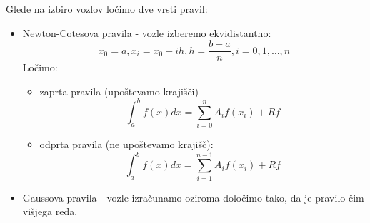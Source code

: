 \documentclass[a4paper,12pt]{article}
\theoremstyle{definition}
\theoremstyle{remark}
\begin{document}
Glede na izbiro vozlov ločimo dve vrsti pravil:
\begin{itemize}
    \item Newton-Cotesova pravila - vozle izberemo ekvidistantno: 
    \begin{equation*}
        x_0 = a, x_i = x_0 + ih, h = \frac{b-a}{n}, i = 0, 1, \dots, n
    \end{equation*}
    Ločimo:
    \begin{itemize}
        \item zaprta pravila (upoštevamo krajišči)
        \begin{equation*}
            \int_{a}^{b} f(x) dx = \sum_{i=0}^{n} A_i f(x_i) + Rf
        \end{equation*}
        \item odprta pravila (ne upoštevamo krajišč):
        \begin{equation*}
            \int_{a}^{b} f(x) dx = \sum_{i=1}^{n-1} A_i f(x_i) + Rf
        \end{equation*}
    \end{itemize}
    \item Gaussova pravila - vozle izračunamo oziroma določimo tako, da je pravilo čim višjega reda.
\end{itemize}
\end{document}
